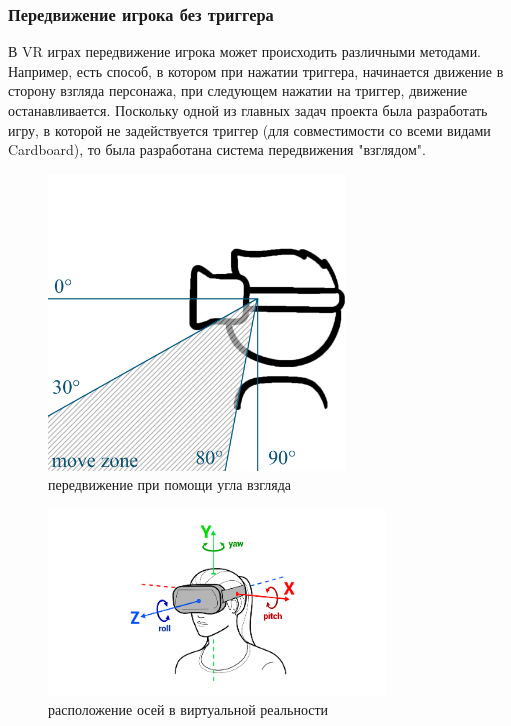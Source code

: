 \subsubsection{Передвижение игрока без триггера}
\tab[0.75cm]В VR играх передвижение игрока может происходить различными методами. Например, 
есть способ, в котором при нажатии триггера, начинается движение в сторону 
взгляда персонажа, при следующем нажатии на триггер, движение останавливается. 
Поскольку одной из главных задач проекта была разработать игру, в которой не 
задействуется триггер (для совместимости со всеми видами Cardboard), то была 
разработана система передвижения "взглядом".

\newpage

\begin{figure}[h!]
    \centering
    \includegraphics[width=0.7\textwidth]{./pics/vrAngles.png}
    \caption{\small{передвижение при помощи угла взгляда}}
    \label{move_angles}
\end{figure}

\begin{figure}[h!]
    \centering
    \includegraphics[width=0.8\textwidth]{./pics/angles.png}
    \caption{\small{расположение осей в виртуальной реальности}}
    \label{axes}
\end{figure}

